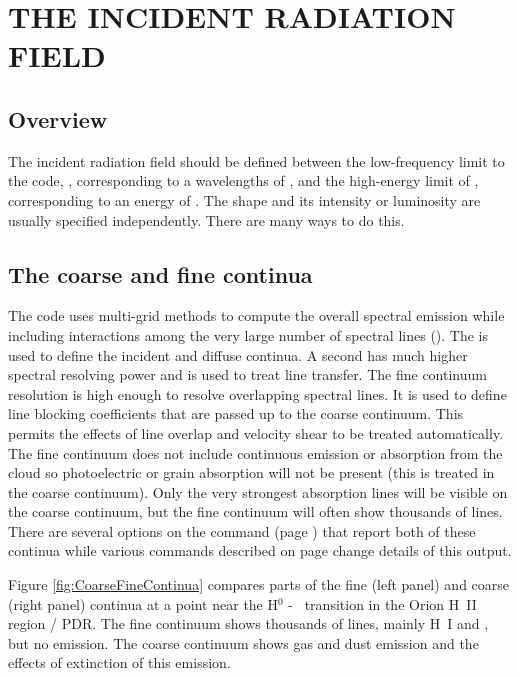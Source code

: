 \chapter{THE INCIDENT RADIATION FIELD}

\section{Overview}

The incident radiation field should be defined between the low-frequency limit
to the code, \emmmhz, corresponding to a wavelengths of \emmcm,
and the high-energy limit of \egamry, corresponding to an energy of \egamrymev.
The shape and its intensity or luminosity are usually specified
independently.
There are many ways to do this.

\section{The coarse and fine continua}

The code uses multi-grid methods to compute the overall spectral emission while
including  interactions among the
very large number of spectral lines (\citealp{Shaw2005}).  
The  is used to define the
incident and diffuse continua.
A second  has much higher spectral resolving power and
is used to treat line transfer.
The fine continuum resolution is high enough to resolve overlapping spectral
lines.  
It is used to define line blocking coefficients that are passed up to the coarse continuum.  
This permits the effects of line overlap and velocity shear to be treated automatically.
The fine continuum does not include continuous
emission or absorption from the cloud so photoelectric or grain absorption will not be present
(this is treated in the coarse continuum).  
Only the very strongest absorption lines will be visible on the coarse continuum, but
the fine continuum will often show thousands of lines.
There are several options
on the  command 
(page \pageref{sec:CommandSaveContinuum}) that report both of these continua
while various  commands described on 
page \pageref{sec:CommandSetContinuumOptions} change details of this output.

Figure \ref{fig:CoarseFineContinua} compares parts of the fine (left panel) and
coarse (right panel) continua at a point near the H$^0$ - \htwo\ transition in 
the Orion H~II region / PDR.  
The fine continuum shows thousands of lines, mainly H~I and \htwo, but no emission.
The coarse continuum shows gas and dust emission and the effects of extinction of this emission.

